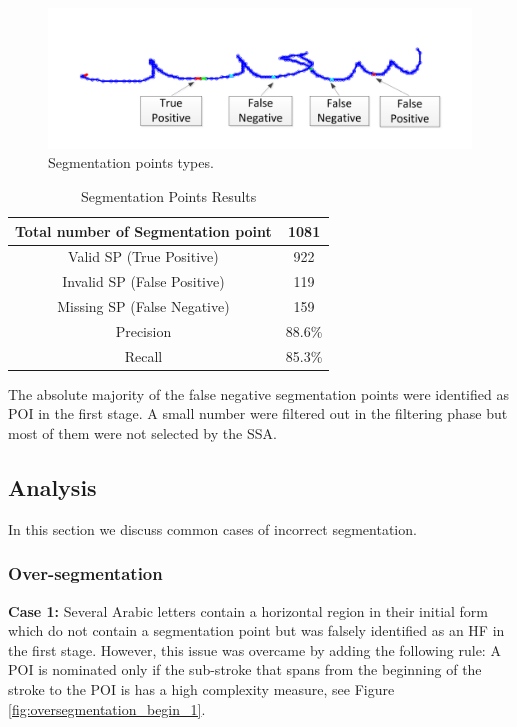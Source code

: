 \documentclass[journal,compsoc]{IEEEtran}
\begin{document}
\begin{figure}
\centering
\includegraphics[width=0.9\columnwidth]{./figures/sp_types}
\caption{Segmentation points types.}
\label{fig:sp_types}
\end{figure}

\begin{table}[h]
\caption{Segmentation Points Results}
\begin{tabular}{ | c | c | }
  \hline
  Total number of Segmentation point & 1081 \\
  \hline
  Valid SP (True Positive) & 922 \\
  \hline
  Invalid SP (False Positive) & 119 \\
  \hline
  Missing SP (False Negative) & 159 \\
  \hline                                    
  Precision & 88.6\% \\ 
 \hline
  Recall &  85.3\% \\ 
 \hline
\end{tabular}
\centering
\label{table:sp_results} 
\end{table}

The absolute majority of the false negative segmentation points were identified as POI in the first stage. A small number were filtered out in the filtering phase but most of them were not selected by the SSA.

\subsection{Analysis}
In this section we discuss common cases of incorrect segmentation.
\subsubsection{Over-segmentation}
\textbf{Case 1:} Several Arabic letters contain a horizontal region in their initial form which do not contain a segmentation point but was falsely identified as an HF in the first stage. However, this issue was overcame by adding the following rule: A POI is nominated only if the sub-stroke that spans from the beginning of the stroke to the POI is has a high complexity measure, see Figure \ref{fig:oversegmentation_begin_1}.\\
\end{document}
